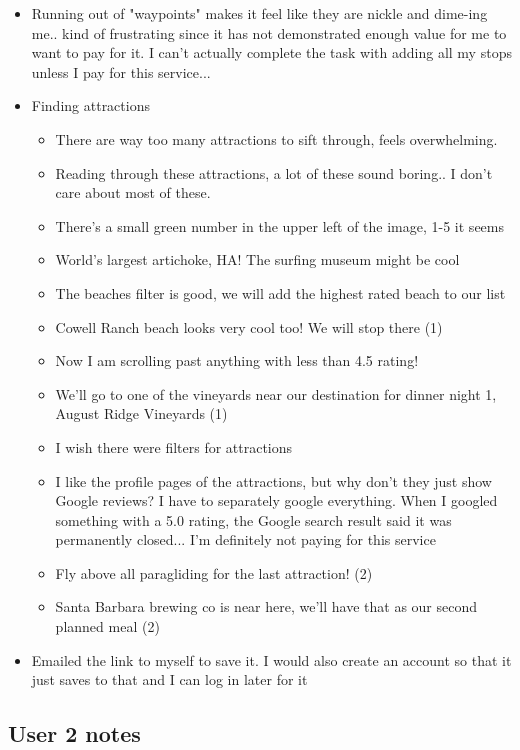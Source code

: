 \begin{itemize}
\item Running out of "waypoints" makes it feel like they are nickle and dime-ing me.. kind of frustrating since it has not demonstrated enough value for me to want to pay for it. I can't actually complete the task with adding all my stops unless I pay for this service...
\item Finding attractions
  \begin{itemize}
  \item There are way too many attractions to sift through, feels overwhelming.
  \item Reading through these attractions, a lot of these sound boring.. I don't care about most of these.
  \item There's a small green number in the upper left of the image, 1-5 it seems
  \item World's largest artichoke, HA! The surfing museum might be cool
  \item The beaches filter is good, we will add the highest rated beach to our list
  \item Cowell Ranch beach looks very cool too! We will stop there (1)
  \item Now I am scrolling past anything with less than 4.5 rating!
  \item We'll go to one of the vineyards near our destination for dinner night 1, August Ridge Vineyards (1)
  \item I wish there were filters for attractions
  \item I like the profile pages of the attractions, but why don't they just show Google reviews? I have to separately google everything. When I googled something with a 5.0 rating, the Google search result said it was permanently closed... I'm definitely not paying for this service
  \item Fly above all paragliding for the last attraction! (2)
  \item Santa Barbara brewing co is near here, we'll have that as our second planned meal (2)
  \end{itemize}
\item Emailed the link to myself to save it. I would also create an account so that it just saves to that and I can log in later for it
\end{itemize}

\subsection{User 2 notes}

